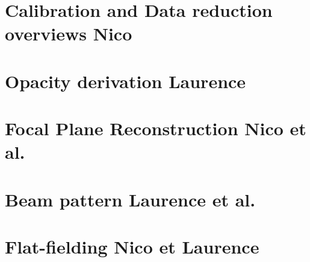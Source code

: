 \documentclass[a4paper, 11pt]{article} %
\begin{document}
\clearpage
\section{Calibration and Data reduction overviews {\color{blue} Nico} }
\label{se:calib_pipeline}


\clearpage
\section{Opacity derivation {\color{blue} Laurence}}
\label{se:opacities}



\clearpage
\section{Focal Plane Reconstruction {\color{blue} Nico et al. }}
\label{se:fp_reconstruction}



\clearpage
\section{Beam pattern {\color{blue} Laurence et al.} }
\label{se:beams}



\clearpage
\section{Flat-fielding {\color{blue} Nico et Laurence} }
\label{se:flat_field}

\end{document}
